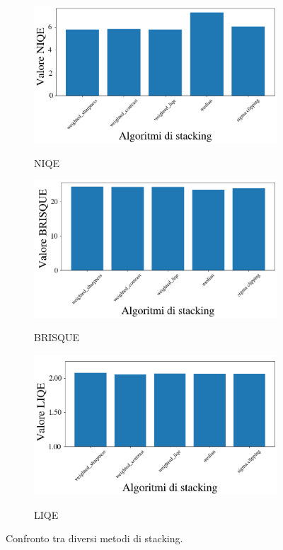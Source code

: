 \begin{figure}[H]
    \centering
    \begin{subfigure}[t]{0.49\textwidth}
        \centering
        \caption{NIQE}
        \includegraphics[width=\linewidth]{../assets/stack_NIQE.png}
        \label{fig:stack_niqe}
    \end{subfigure}
    \hfill
    \begin{subfigure}[t]{0.49\textwidth}
        \centering
        \caption{BRISQUE}
        \includegraphics[width=\linewidth]{../assets/stack_BRISQUE.png}
        \label{fig:stack_brisque}
    \end{subfigure}
    \hfill
    \begin{subfigure}[t]{0.49\textwidth}
        \centering
        \caption{LIQE}
        \includegraphics[width=\linewidth]{../assets/stack_LIQE.png}
        \label{fig:stack_liqe}
    \end{subfigure}
    \caption{Confronto tra diversi metodi di stacking.}
    \label{fig:confronto-stacking}
\end{figure}

